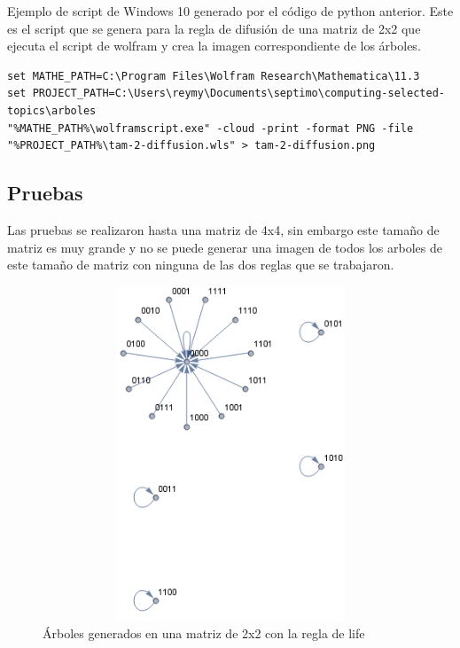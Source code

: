 Ejemplo de script de Windows 10 generado por el código de python anterior. Este es el script que se genera para la regla de difusión de una matriz de 2x2  que ejecuta el script de wolfram y crea la imagen correspondiente de los árboles.
\begin{lstlisting}
set MATHE_PATH=C:\Program Files\Wolfram Research\Mathematica\11.3
set PROJECT_PATH=C:\Users\reymy\Documents\septimo\computing-selected-topics\arboles
"%MATHE_PATH%\wolframscript.exe" -cloud -print -format PNG -file "%PROJECT_PATH%\tam-2-diffusion.wls" > tam-2-diffusion.png
\end{lstlisting}
\subsection{Pruebas}
Las pruebas se realizaron hasta una matriz de 4x4, sin embargo este tamaño de matriz es muy grande y no se puede generar una imagen de todos los arboles de este tamaño de matriz con ninguna de las dos reglas que se trabajaron.

\begin{figure}[H]
\begin{center}
 \includegraphics[width=12cm, height=10cm]{./img/tam-2-life.png}
 \caption{Árboles generados en una matriz de 2x2 con la regla de life}
 \label{fig:life2}
\end{center}
\end{figure}

